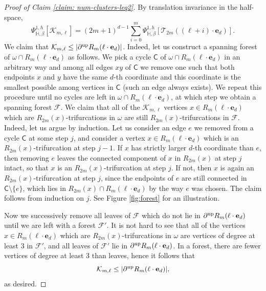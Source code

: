\documentclass[11pt,a4paper]{article}
\numberwithin{equation}{section}
\theoremstyle{plain}
\theoremstyle{definition}
\begin{document}
\begin{proof}[Proof of Claim \textup{\ref{claim: num-clusters-leq2}}]
By translation invariance in the half-space,
\begin{equation}\label{eq: K_m}
\Psi^{1,h}_{\mathbb{H},\beta}[\mathcal{K}_{m,\ell}]=(2m+1)^{d-1}\sum_{i=0}^m \Psi^{1,h}_{\mathbb{H},\beta}[\mathcal{T}_{2m}((\ell+i)\cdot\mathbf{e}_d)].
\end{equation}
We claim that $\mathcal{K}_{m,\ell}\le |\partial^{\textup{up}} R_m(\ell\cdot \mathbf{e}_d)|$. Indeed, let us construct a spanning forest of $\omega\cap R_m(\ell\cdot \mathbf{e}_d)$ as follows. We pick a cycle $\mathsf C$ of $\omega\cap R_m(\ell\cdot \mathbf{e}_d)$ in an arbitrary way and among all edges $xy$ of $\mathsf C$ we remove one such that both endpoints $x$ and $y$ have the same $d$-th coordinate and this coordinate is the smallest possible among vertices in $\mathsf C$ (such an edge always exists). We repeat this procedure until no cycles are left in $\omega\cap R_m(\ell\cdot \mathbf{e}_d)$, at which step we obtain a spanning forest $\mathcal{F}$. We claim that all of the $\mathcal{K}_{m,\ell}$ vertices $x\in R_m(\ell\cdot \mathbf{e}_d)$ which are $R_{2m}(x)$-trifurcations in $\omega$ are still $R_{2m}(x)$-trifurcations in $\mathcal{F}$. Indeed, let us argue by induction. Let us consider an edge $e$ we removed from a cycle $\mathsf C$ at some step $j$, and consider a vertex $x\in R_m(\ell\cdot \mathbf{e}_d)$ which is an $R_{2m}(x)$-trifurcation at step $j-1$. If $x$ has strictly larger $d$-th coordinate than $e$, then removing $e$ leaves the connected component of $x$ in $R_{2m}(x)$ at step $j$ intact, so that $x$ is an $R_{2m}(x)$-trifurcation at step $j$. If not, then $x$ is again an $R_{2m}(x)$-trifurcation at step $j$, since the endpoints of $e$ are still connected in $\mathsf C\setminus\{e\}$, which lies in $R_{2m}(x)\cap R_m(\ell\cdot \mathbf{e}_d)$ by the way $e$ was chosen. The claim follows from induction on $j$. See Figure \ref{fig:forest} for an illustration.


Now we successively remove all leaves of $\mathcal{F}$ which do not lie in $\partial^{\textup{up}} R_m(\ell \cdot \mathbf{e}_d)$ until we are left with a forest $\mathcal{F}'$. It is not hard to see that all of the vertices $x\in R_m(\ell \cdot \mathbf{e}_d)$ which are $R_{2m}(x)$-trifurcations in $\omega$ are vertices of degree at least $3$ in $\mathcal{F}'$, and all leaves of $\mathcal{F}'$ lie in $\partial^{\textup{up}} R_m(\ell\cdot \mathbf{e}_d)$. In a forest, there are fewer vertices of degree at least $3$ than leaves, hence it follows that
\begin{equation} \label{eq: bound on K_m}
\mathcal{K}_{m,\ell}\le |\partial^{\textup{up}} R_m(\ell \cdot \mathbf{e}_d)|, 
\end{equation}
as desired.


\end{proof}
\end{document}
